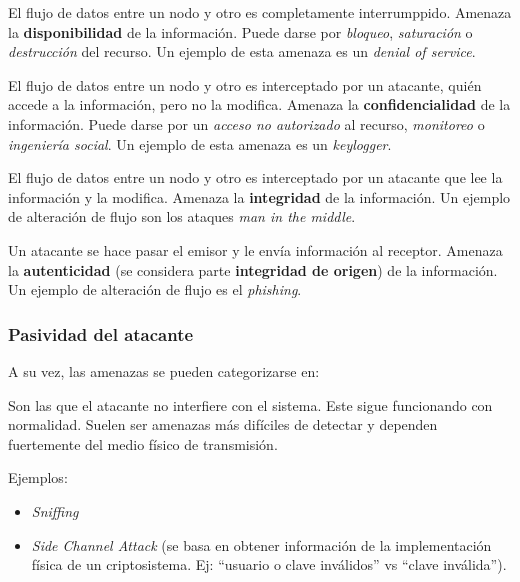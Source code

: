 \documentclass[]{article}
\begin{document}

El flujo de datos entre un nodo y otro es completamente interrumppido. Amenaza la \textbf{disponibilidad} de la información. Puede darse por \emph{bloqueo}, \emph{saturación} o \emph{destrucción} del recurso. Un ejemplo de esta amenaza es un \emph{denial of service}.


El flujo de datos entre un nodo y otro es interceptado por un atacante, quién accede a la información, pero no la modifica. Amenaza la \textbf{confidencialidad} de la información. Puede darse por un \emph{acceso no autorizado} al recurso, \emph{monitoreo} o \emph{ingeniería social}. Un ejemplo de esta amenaza es un \emph{keylogger}.


El flujo de datos entre un nodo y otro es interceptado por un atacante que lee la información y la modifica. Amenaza la \textbf{integridad} de la información. Un ejemplo de alteración de flujo son los ataques \emph{man in the middle}.



Un atacante se hace pasar el emisor y le envía información al receptor. Amenaza la \textbf{autenticidad} (se considera parte \textbf{integridad de origen}) de la información. Un ejemplo de alteración de flujo es el \emph{phishing}.

\subsubsection{Pasividad del atacante}
A su vez, las amenazas se pueden categorizarse en:

Son las que el atacante no interfiere con el sistema. Este sigue funcionando con normalidad. Suelen ser amenazas más difíciles de detectar y dependen fuertemente del medio físico de transmisión.

Ejemplos:
\begin{itemize}
	\item \emph{Sniffing}
	\item \emph{Side Channel Attack} (se basa en obtener información de la implementación física de un criptosistema. Ej: ``usuario o clave inválidos'' vs ``clave inválida'').
\end{itemize}
\end{document}
